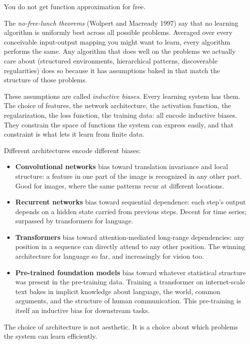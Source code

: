 You do not get function approximation for free.

The \emph{no-free-lunch theorems} (Wolpert and Macready 1997) say that no learning algorithm is uniformly best across all possible problems. Averaged over every conceivable input-output mapping you might want to learn, every algorithm performs the same. Any algorithm that does well on the problems we actually care about (structured environments, hierarchical patterns, discoverable regularities) does so because it has assumptions baked in that match the structure of those problems.

These assumptions are called \emph{inductive biases}. Every learning system has them. The choice of features, the network architecture, the activation function, the regularization, the loss function, the training data: all encode inductive biases. They constrain the space of functions the system can express easily, and that constraint is what lets it learn from finite data.

Different architectures encode different biases:

\begin{itemize}
\item \textbf{Convolutional networks} bias toward translation invariance and local structure: a feature in one part of the image is recognized in any other part. Good for images, where the same patterns recur at different locations.
\item \textbf{Recurrent networks} bias toward sequential dependence: each step's output depends on a hidden state carried from previous steps. Decent for time series; surpassed by transformers for language.
\item \textbf{Transformers} bias toward attention-mediated long-range dependencies: any position in a sequence can directly attend to any other position. The winning architecture for language so far, and increasingly for vision too.
\item \textbf{Pre-trained foundation models} bias toward whatever statistical structure was present in the pre-training data. Training a transformer on internet-scale text bakes in implicit knowledge about language, the world, common arguments, and the structure of human communication. This pre-training is itself an inductive bias for downstream tasks.
\end{itemize}

The choice of architecture is not aesthetic. It is a choice about which problems the system can learn efficiently.

